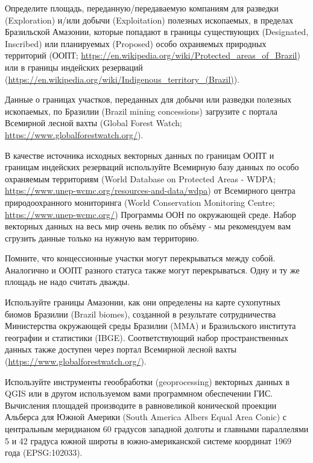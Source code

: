 
Определите площадь, переданную/передаваемую компаниям для разведки \linebreak (Exploration) 
и/или добычи (Exploitation) полезных ископаемых, в пределах Бразильской Амазонии, 
которые попадают в границы существующих (Designated, \linebreak Inscribed) или планируемых (Proposed) 
особо охраняемых природных территорий (ООПТ; \url{https://en.wikipedia.org/wiki/Protected_areas_of_Brazil}) или 
в границы индейских резерваций (\url{https://en.wikipedia.org/wiki/Indigenous_territo}\linebreak\url{ry_(Brazil)}).

Данные о границах участков, переданных для добычи или разведки полезных ископаемых, по Бразилии 
(Brazil mining concessions) загрузите с портала Всемирной лесной вахты (Global Forest Watch; \url{https://www.globalforestwatch.org/}).

В качестве источника исходных векторных данных по границам ООПТ и границам индейских резерваций используйте 
Всемирную базу данных по особо охраняемым территориям (World Database on Protected Areas - WDPA; \url{https://www.unep-wcmc.org/resources-and-data/wdpa}) 
от Всемирного центра природоохранного мониторинга (World Conservation Monitoring Centre; \url{https://www.unep-wcmc.org/}) Программы ООН по окружающей среде. Набор векторных данных на весь мир очень велик по объёму - мы рекомендуем вам сгрузить данные только на нужную вам территорию.

Помните, что концессионные участки могут перекрываться между собой. Аналогично и ООПТ разного статуса также могут перекрываться. Одну и ту же площадь не надо считать дважды.

Используйте границы Амазонии, как они определены на карте сухопутных биомов Бразилии (Brazil biomes), 
созданной в результате сотрудничества Министерства окружающей среды Бразилии (MMA) и Бразильского института 
географии и статистики (IBGE). Соответствующий набор пространственных данных также доступен через портал 
Всемирной лесной вахты (\url{https://www.globalforestwatch.org/}).

Используйте инструменты геообработки (geoprocessing) векторных данных в \linebreak QGIS или в другом используемом вами программном обеспечении ГИС. Вычисления площадей производите в равновеликой конической проекции Альберса для Южной Америки (South America Albers Equal Area Conic) с центральным меридианом 60 градусов западной долготы и главными параллелями 5 и 42 градуса южной широты в южно-американской системе координат 1969 года (EPSG:102033).

